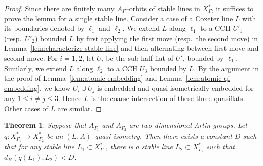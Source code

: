 \documentclass[11pt]{amsart}
\newtheorem{theorem}{Theorem}[section]
\theoremstyle{definition}
\newcommand{\Xa}{X^{\ast}}
\begin{document}
\begin{proof}
Since there are finitely many $A_\Gamma$--orbits of stable lines in $\Xa_\Gamma$, it suffices to prove the lemma for a single stable line. Consider a case of a Coxeter line $L$ with its boundaries denoted by $\ell_1$ and $\ell_2$. We extend $L$ along $\ell_1$ to a CCH $U'_1$ (resp.\ $U'_2$) bounded $L$ by first applying the first move (resp.\ the second move) in Lemma~\ref{lem:characterize stable line} and then alternating between first move and second move. For $i=1,2$, let $U_i$ be the sub-half-flat of $U'_i$ bounded by $\ell_1$. Similarly, we extend $L$ along $\ell_2$ to a CCH $U_3$ bounded by $L$. By the argument in the proof of Lemma~\ref{lem:atomic embedding} and Lemma~\ref{lem:atomic qi embedding}, we know $U_i\cup U_j$ is embedded and quasi-isometrically embedded for any $1\le i\neq j\le 3$. Hence $L$ is the coarse intersection of these three quasiflats. Other cases of $L$ are similar.
\end{proof}

\begin{theorem}
	\label{thm:preservation of stable lines}
Suppose that $A_{\Gamma_1}$ and $A_{\Gamma_2}$ are two-dimensional Artin groups. Let $q\colon \Xa_{\Gamma_1}\to \Xa_{\Gamma_2}$ be an $(L,A)$--quasi-isometry. Then there exists a constant $D$ such that for any stable line $L_1\subset \Xa_{\Gamma_1}$, there is a stable line $L_2\subset \Xa_{\Gamma_2}$ such that $d_H(q(L_1),L_2)<D$.
\end{theorem}
\end{document}
